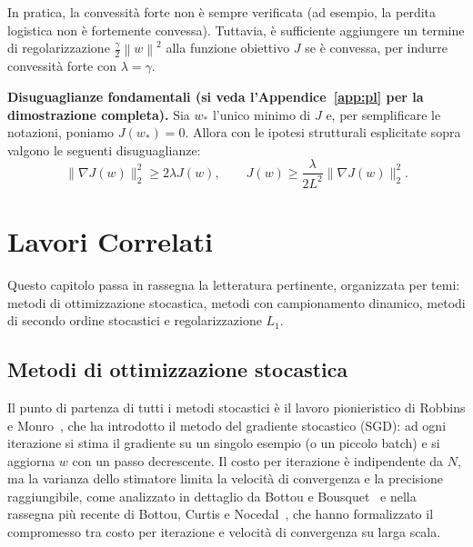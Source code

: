\documentclass[a4paper,12pt]{article}
\numberwithin{equation}{section}
\numberwithin{figure}{section}
\numberwithin{table}{section}
\newcommand{\norm}[1]{\left\|#1\right\|}
\begin{document}
\begin{notebox}
  In pratica, la convessit\`a forte non \`e sempre verificata (ad esempio, la perdita logistica non \`e fortemente convessa). Tuttavia, \`e sufficiente aggiungere un termine di regolarizzazione $\frac{\gamma}{2}\norm{w}^2$ alla funzione obiettivo $J$ se è convessa, per indurre convessit\`a forte con $\lambda = \gamma$.
\end{notebox}
\begin{notebox}
  \textbf{Disuguaglianze fondamentali (si veda l'Appendice~\ref{app:pl} per la dimostrazione completa).}
  Sia $w_*$ l'unico minimo di $J$ e, per semplificare le notazioni, poniamo $J(w_*) = 0$. Allora con le ipotesi strutturali esplicitate sopra valgono le seguenti disuguaglianze:
  \[
  \|\nabla J(w)\|_2^2 \geq 2\lambda J(w), \qquad J(w) \geq \frac{\lambda}{2L^2} \|\nabla J(w)\|_2^2.
  \]
\end{notebox}
\newpage

\section{Lavori Correlati}\label{sec:lavori}

Questo capitolo passa in rassegna la letteratura pertinente, organizzata per
temi: metodi di ottimizzazione stocastica, metodi con campionamento dinamico,
metodi di secondo ordine stocastici e regolarizzazione $L_1$.

\subsection{Metodi di ottimizzazione stocastica}

Il punto di partenza di tutti i metodi stocastici è il lavoro pionieristico di
Robbins e Monro~\cite{robbins1951}, che ha introdotto il metodo del gradiente
stocastico (SGD): ad ogni iterazione si stima il gradiente su un singolo
esempio (o un piccolo batch) e si aggiorna $w$ con un passo decrescente.
Il costo per iterazione è indipendente da $N$, ma la varianza dello stimatore
limita la velocità di convergenza e la precisione raggiungibile, come analizzato
in dettaglio da Bottou e Bousquet~\cite{bottou2008} e nella rassegna
più recente di Bottou, Curtis e Nocedal~\cite{bottou2018}, che hanno formalizzato il
compromesso tra costo per iterazione e velocità di convergenza su larga scala.
\end{document}
